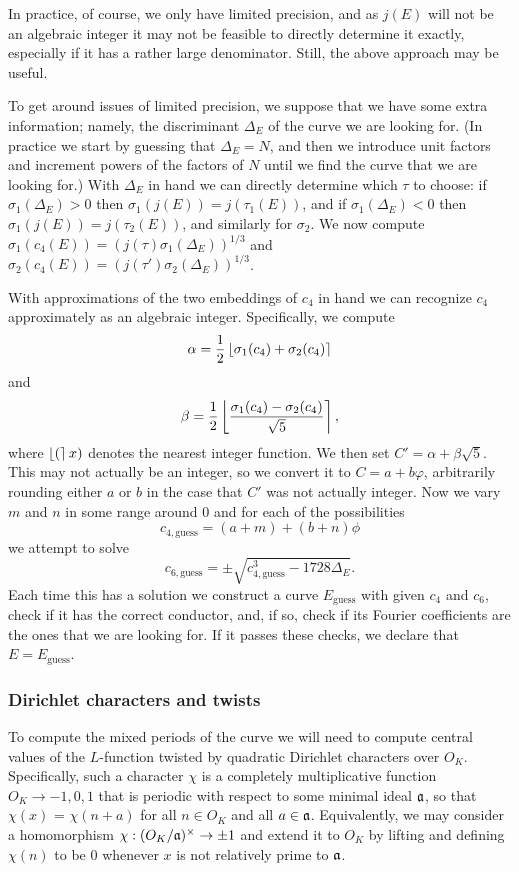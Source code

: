 In practice, of course, we only have limited precision, and as $j(E)$ will not be an algebraic integer it may
not be feasible to directly determine it exactly, especially if it has a rather large denominator. Still,
the above approach may be useful.

To get around issues of limited precision, we suppose that we have some extra information; namely, the discriminant
$\Delta_E$ of the curve we are looking for. (In practice we start by guessing that $\Delta_E = N$, and then we
introduce unit factors and increment powers of the factors of $N$ until we find the curve that we are looking for.)
With $\Delta_E$ in hand we can directly determine which $\tau$ to choose: if $\sigma_1(\Delta_E) > 0$ then
$\sigma_1(j(E)) = j(\tau_1(E))$, and if $\sigma_1(\Delta_E) < 0$ then $\sigma_1(j(E)) = j(\tau_2(E))$, and
similarly for $\sigma_2$. We now compute $\sigma_1(c_4(E)) = (j(\tau) \sigma_1(\Delta_E))^{1/3}$ and
$\sigma_2(c_4(E)) = (j(\tau') \sigma_2(\Delta_E))^{1/3}$.

With approximations of the two embeddings of $c_4$ in hand we can recognize $c_4$ approximately as an algebraic
integer. Specifically, we compute
\[
    \alpha = \frac{1}{2}\left\lfloor{\sigma_1(c_4) + \sigma_2(c_4)}\right\rceil
\]
and
\[
    \beta = \frac{1}{2}\left\lfloor{\frac{\sigma_1(c_4) - \sigma_2(c_4)}{\sqrt{5}}}\right\rceil,
\]
where $\left\lfloor{(}\right\rceil x)$ denotes the nearest integer function. We then set $C' = \alpha + \beta\sqrt{5}$. This may
not actually be an integer, so we convert it to $C = a + b \varphi$, arbitrarily rounding either $a$ or $b$
in the case that $C'$ was not actually integer. Now we vary $m$ and $n$ in some range around $0$ and for
each of the possibilities
\[
    c_{4, \mathrm{guess}} = (a + m) + (b + n)\phi
\]
we attempt to solve
\[
    c_{6, \mathrm{guess}} = \pm \sqrt{c_{4, \mathrm{guess}}^3 - 1728 \Delta_E}.
\]
Each time this has a solution we construct a curve $E_{\mathrm{guess}}$ with given $c_4$ and $c_6$, check
if it has the correct conductor, and, if so, check if its Fourier coefficients are the ones that we are looking
for. If it passes these checks, we declare that $E = E_{\mathrm{guess}}$.

\subsubsection{Dirichlet characters and twists}

To compute the mixed periods of the curve we will need to compute central values of the $L$-function
twisted by quadratic Dirichlet characters over $O_K$. Specifically, such a character $\chi$ is a completely
multiplicative function $O_K \rightarrow {-1, 0, 1}$ that is periodic with respect to some minimal ideal $\mathfrak{a}$,
so that $\chi(x)$ = $\chi(n + a)$ for all $n \in O_K$ and all $a \in \mathfrak{a}$. Equivalently, we may consider a
homomorphism $\chi : (O_K/\mathfrak{a})^\times \rightarrow {\pm 1}$ and extend it to $O_K$ by lifting and defining
$\chi(n)$ to be $0$ whenever $x$ is not relatively prime to $\mathfrak{a}$.

